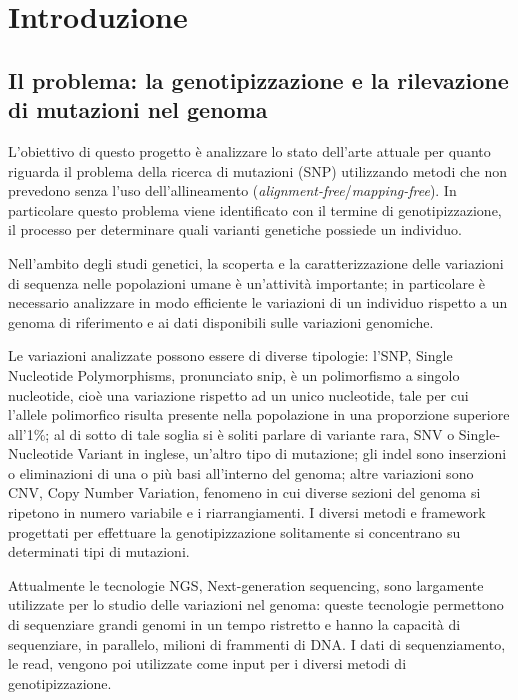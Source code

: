 \documentclass[../main.tex]{subfiles}
\begin{document}
\section{Introduzione}

\subsection{Il problema: la genotipizzazione e la rilevazione di mutazioni nel genoma}

L'obiettivo di questo progetto è analizzare lo stato dell'arte attuale per quanto riguarda il problema della ricerca di mutazioni (SNP) utilizzando metodi che non prevedono senza l'uso dell'allineamento (\textit{alignment-free}/\textit{mapping-free}). In particolare questo problema viene identificato con il termine di genotipizzazione, il processo per determinare quali varianti genetiche possiede un individuo.


Nell'ambito degli studi genetici, la scoperta e la caratterizzazione delle variazioni di sequenza nelle popolazioni umane è un'attività importante; in particolare è necessario analizzare in modo efficiente le variazioni di un individuo rispetto a un genoma di riferimento e ai dati disponibili sulle variazioni genomiche. 


Le variazioni analizzate possono essere di diverse tipologie: l'SNP, Single Nucleotide Polymorphisms, pronunciato snip, è un polimorfismo a singolo nucleotide, cioè una variazione rispetto ad un unico nucleotide, tale per cui l'allele polimorfico risulta presente nella popolazione in una proporzione superiore all'1\%; al di sotto di tale soglia si è soliti parlare di variante rara, SNV o Single-Nucleotide Variant in inglese, un'altro tipo di mutazione; gli indel sono inserzioni o eliminazioni di una o più basi all'interno del genoma; altre variazioni sono CNV, Copy Number Variation, fenomeno in cui diverse sezioni del genoma si ripetono in numero variabile e i riarrangiamenti. I diversi metodi e framework progettati per effettuare la genotipizzazione solitamente si concentrano su determinati tipi di mutazioni.


Attualmente le tecnologie NGS, Next-generation sequencing, sono largamente utilizzate per lo studio delle variazioni nel genoma: queste tecnologie permettono di sequenziare grandi genomi in un tempo ristretto e hanno la capacità di sequenziare, in parallelo, milioni di frammenti di DNA. I dati di sequenziamento, le read, vengono poi utilizzate come input per i diversi metodi di genotipizzazione.
\end{document}
